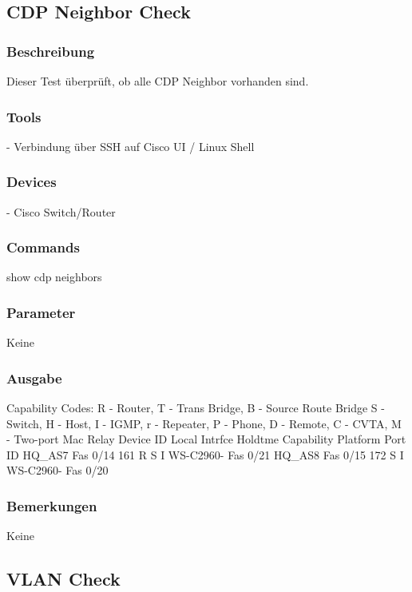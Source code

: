 \documentclass[a4,12pt]{scrartcl}
\begin{document}
\subsection{CDP Neighbor Check}
\subsubsection{Beschreibung}
Dieser Test überprüft, ob alle CDP Neighbor vorhanden sind.
\subsubsection{Tools}
- Verbindung über SSH auf Cisco UI / Linux Shell
\subsubsection{Devices}
- Cisco Switch/Router
\subsubsection{Commands}
show cdp neighbors
\subsubsection{Parameter}
Keine
\subsubsection{Ausgabe}
Capability Codes: R - Router, T - Trans Bridge, B - Source Route Bridge\newline
                  S - Switch, H - Host, I - IGMP, r - Repeater, P - Phone,\newline
                  D - Remote, C - CVTA, M - Two-port Mac Relay\newline
Device ID        Local Intrfce     Holdtme    Capability  Platform  Port ID\newline
HQ_AS7           Fas 0/14          161             R S I  WS-C2960- Fas 0/21\newline
HQ_AS8           Fas 0/15          172              S I   WS-C2960- Fas 0/20\newline
\subsubsection{Bemerkungen}
Keine





\subsection{VLAN Check}
\end{document}
